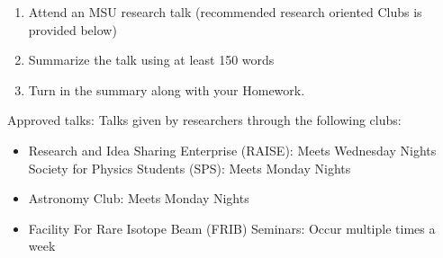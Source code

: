 \documentclass[%
oneside,                 %
final,                   %
10pt]{article}
\begin{document}
\begin{enumerate}
\item Attend an MSU research talk (recommended research oriented Clubs is  provided below)

\item Summarize the talk using at least 150 words

\item Turn in the summary along with your Homework.
\end{enumerate}

\noindent
Approved talks:
Talks given by researchers through the following clubs:
\begin{itemize}
\item Research and Idea Sharing Enterprise (RAISE)​: Meets Wednesday Nights Society for Physics Students (SPS)​: Meets Monday Nights

\item Astronomy Club​: Meets Monday Nights

\item Facility For Rare Isotope Beam (FRIB) Seminars: ​Occur multiple times a week
\end{itemize}

\noindent

\end{document}
